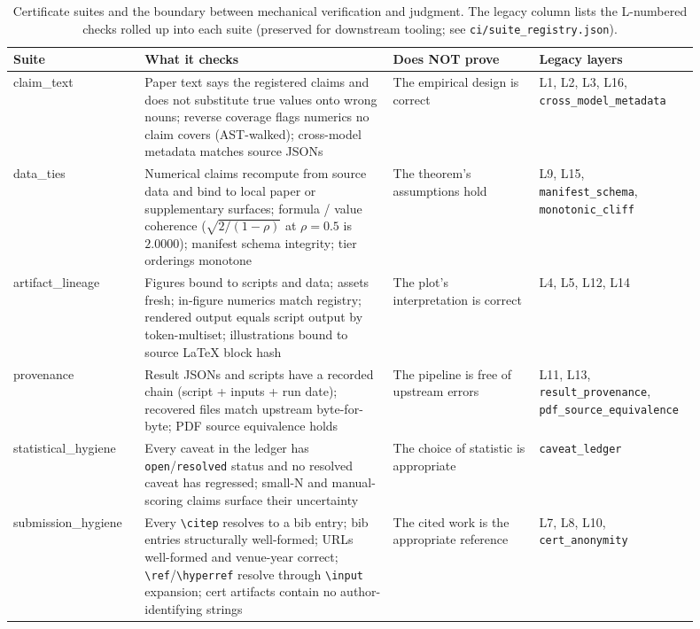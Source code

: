 \documentclass{article}
\theoremstyle{plain}
\theoremstyle{definition}
\theoremstyle{remark}
\begin{document}
\begin{table}[h]
\centering
\small
\caption{Certificate suites and the boundary between mechanical verification and judgment. The legacy column lists the L-numbered checks rolled up into each suite (preserved for downstream tooling; see \texttt{ci/suite\_registry.json}).}
\label{tab:cert_layers}
\begin{tabular}{p{0.18\linewidth}p{0.34\linewidth}p{0.20\linewidth}p{0.18\linewidth}}
\toprule
\textbf{Suite} & \textbf{What it checks} & \textbf{Does NOT prove} & \textbf{Legacy layers} \\
\midrule
claim\_text & Paper text says the registered claims and does not substitute true values onto wrong nouns; reverse coverage flags numerics no claim covers (AST-walked); cross-model metadata matches source JSONs & The empirical design is correct & L1, L2, L3, L16, \texttt{cross\_model\_metadata} \\
\midrule
data\_ties & Numerical claims recompute from source data and bind to local paper or supplementary surfaces; formula / value coherence ($\sqrt{2/(1{-}\rho)}$ at $\rho{=}0.5$ is $2.0000$); manifest schema integrity; tier orderings monotone & The theorem's assumptions hold & L9, L15, \texttt{manifest\_schema}, \texttt{monotonic\_cliff} \\
\midrule
artifact\_lineage & Figures bound to scripts and data; assets fresh; in-figure numerics match registry; rendered output equals script output by token-multiset; illustrations bound to source LaTeX block hash & The plot's interpretation is correct & L4, L5, L12, L14 \\
\midrule
provenance & Result JSONs and scripts have a recorded chain (script + inputs + run date); recovered files match upstream byte-for-byte; PDF source equivalence holds & The pipeline is free of upstream errors & L11, L13, \texttt{result\_provenance}, \texttt{pdf\_source\_equivalence} \\
\midrule
statistical\_hygiene & Every caveat in the ledger has \texttt{open}/\texttt{resolved} status and no resolved caveat has regressed; small-N and manual-scoring claims surface their uncertainty & The choice of statistic is appropriate & \texttt{caveat\_ledger} \\
\midrule
submission\_hygiene & Every \texttt{\textbackslash citep} resolves to a bib entry; bib entries structurally well-formed; URLs well-formed and venue-year correct; \texttt{\textbackslash ref}/\texttt{\textbackslash hyperref} resolve through \texttt{\textbackslash input} expansion; cert artifacts contain no author-identifying strings & The cited work is the appropriate reference & L7, L8, L10, \texttt{cert\_anonymity} \\
\bottomrule
\end{tabular}
\end{table}
\end{document}
